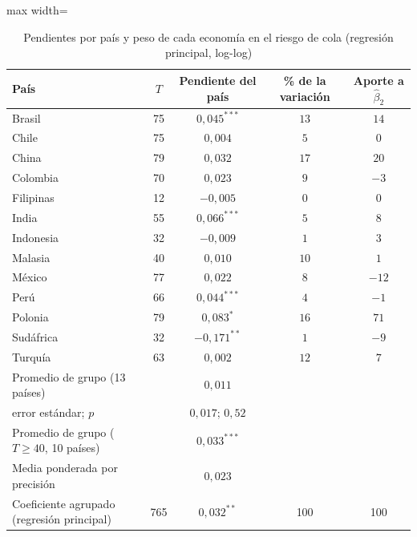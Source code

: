 \begin{table}[htbp]
\centering
\small
\caption[Pendientes por país: riesgo de cola]{Pendientes por país y peso de cada economía en el riesgo de cola (regresión principal, log-log)}
\label{tab:pendientes-pais-cola}
\begin{adjustbox}{max width=\linewidth}
\begin{tabular}{l c c c c}
\toprule
País & $T$ & Pendiente del país & \% de la variación & Aporte a $\hat\beta_2$ \\
\midrule
Brasil & 75 & $0{,}045^{***}$ & $13$ & $14$ \\
Chile & 75 & $0{,}004$ & $5$ & $0$ \\
China & 79 & $0{,}032$ & $17$ & $20$ \\
Colombia & 70 & $0{,}023$ & $9$ & $-3$ \\
Filipinas & 12 & $-0{,}005$ & $0$ & $0$ \\
India & 55 & $0{,}066^{***}$ & $5$ & $8$ \\
Indonesia & 32 & $-0{,}009$ & $1$ & $3$ \\
Malasia & 40 & $0{,}010$ & $10$ & $1$ \\
México & 77 & $0{,}022$ & $8$ & $-12$ \\
Perú & 66 & $0{,}044^{***}$ & $4$ & $-1$ \\
Polonia & 79 & $0{,}083^{*}$ & $16$ & $71$ \\
Sudáfrica & 32 & $-0{,}171^{**}$ & $1$ & $-9$ \\
Turquía & 63 & $0{,}002$ & $12$ & $7$ \\
\midrule
Promedio de grupo (13 países) & & $0{,}011$ & & \\
\quad error estándar; $p$ & & $0{,}017$; $0{,}52$ & & \\
Promedio de grupo ($T\geq40$, 10 países) & & $0{,}033^{***}$ & & \\
Media ponderada por precisión & & $0{,}023$ & & \\
Coeficiente agrupado (regresión principal) & 765 & $0{,}032^{**}$ & 100 & 100 \\
\bottomrule
\end{tabular}
\end{adjustbox}

\end{table}

